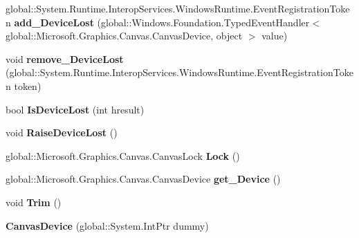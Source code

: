 \begin{DoxyCompactItemize}
global\+::\+System.\+Runtime.\+Interop\+Services.\+Windows\+Runtime.\+Event\+Registration\+Token {\bfseries add\+\_\+\+Device\+Lost} (global\+::\+Windows.\+Foundation.\+Typed\+Event\+Handler$<$ global\+::\+Microsoft.\+Graphics.\+Canvas.\+Canvas\+Device, object $>$ value)
\item 
\mbox{\label{class_microsoft_1_1_graphics_1_1_canvas_1_1_canvas_device_a4a4a0a58940cbe69bb830cd13b27e86c}} 
void {\bfseries remove\+\_\+\+Device\+Lost} (global\+::\+System.\+Runtime.\+Interop\+Services.\+Windows\+Runtime.\+Event\+Registration\+Token token)
\item 
\mbox{\label{class_microsoft_1_1_graphics_1_1_canvas_1_1_canvas_device_aa2c3386bb9c17effeb042c9f84c8037c}} 
bool {\bfseries Is\+Device\+Lost} (int hresult)
\item 
\mbox{\label{class_microsoft_1_1_graphics_1_1_canvas_1_1_canvas_device_a39809eaa6b66baebd35c08254533482e}} 
void {\bfseries Raise\+Device\+Lost} ()
\item 
\mbox{\label{class_microsoft_1_1_graphics_1_1_canvas_1_1_canvas_device_a4f5edc7899938d055a969c1fcb3a3404}} 
global\+::\+Microsoft.\+Graphics.\+Canvas.\+Canvas\+Lock {\bfseries Lock} ()
\item 
\mbox{\label{class_microsoft_1_1_graphics_1_1_canvas_1_1_canvas_device_a9a79960381076f722b1ecba748e5ef20}} 
global\+::\+Microsoft.\+Graphics.\+Canvas.\+Canvas\+Device {\bfseries get\+\_\+\+Device} ()
\item 
\mbox{\label{class_microsoft_1_1_graphics_1_1_canvas_1_1_canvas_device_a8dad763b64fdb6a584603b49fa0998ed}} 
void {\bfseries Trim} ()
\item 
\mbox{\label{class_microsoft_1_1_graphics_1_1_canvas_1_1_canvas_device_a0b344b18a95245487b5ec88f09efd311}} 
{\bfseries Canvas\+Device} (global\+::\+System.\+Int\+Ptr dummy)
\item 

\end{DoxyCompactItemize}
